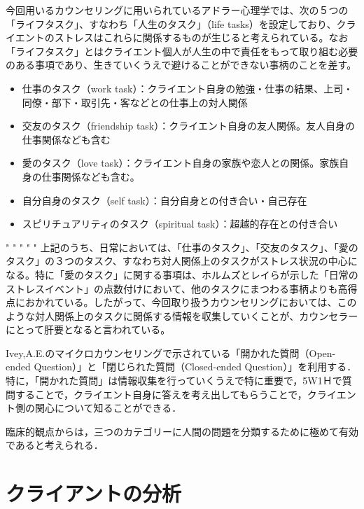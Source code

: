 \documentclass[shuuron]{kuee}
\begin{document}
 今回用いるカウンセリングに用いられているアドラー心理学では、次の５つの「ライフタスク」、すなわち「人生のタスク」（life tasks）を設定しており、クライエントのストレスはこれらに関係するものが生じると考えられている。なお「ライフタスク」とはクライエント個人が人生の中で責任をもって取り組む必要のある事項であり、生きていくうえで避けることができない事柄のことを差す。
 \begin{itemize}
 \item 仕事のタスク（work task）：クライエント自身の勉強・仕事の結果、上司・同僚・部下・取引先・客などとの仕事上の対人関係
 \item 交友のタスク（friendship task）：クライエント自身の友人関係。友人自身の仕事関係なども含む
 \item 愛のタスク（love task）：クライエント自身の家族や恋人との関係。家族自身の仕事関係なども含む。
 \item 自分自身のタスク（self task）：自分自身との付き合い・自己存在
 \item スピリチュアリティのタスク（spiritual task）：超越的存在との付き合い\cite{大友秀治2013全人的人間理解を促進するスピリチュアリティ概念に関する一考察}
 \end{itemize}
"
"
"
"
"
上記のうち、日常においては、「仕事のタスク」、「交友のタスク」、「愛のタスク」の３つのタスク、すなわち対人関係上のタスクがストレス状況の中心になる。特に「愛のタスク」に関する事項は、ホルムズとレイら\cite{holmes1967social}が示した「日常のストレスイベント」の点数付けにおいて、他のタスクにまつわる事柄よりも高得点におかれている。したがって、今回取り扱うカウンセリングにおいては、このような対人関係上のタスクに関係する情報を収集していくことが、カウンセラーにとって肝要となると言われている。



Ivey,A.E.\cite{ivey}のマイクロカウンセリングで示されている「開かれた質問（Open-ended Question）」と「閉じられた質問（Closed-ended Question）」を利用する．特に，「開かれた質問」は情報収集を行っていくうえで特に重要で，5W1Ｈで質問することで，クライエント自身に答えを考え出してもらうことで，クライエント側の関心について知ることができる．




 臨床的観点からは，三つのカテゴリーに人間の問題を分類するために極めて有効であると考えられる．




\section{クライアントの分析}%
\end{document}
